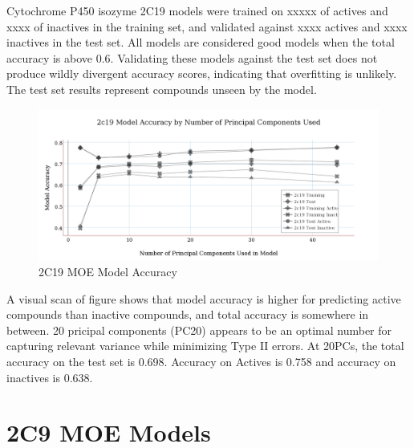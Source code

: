 Cytochrome P450 isozyme 2C19 models were trained on xxxxx of actives and xxxx of inactives in the training set, and validated against xxxx actives and xxxx inactives in the test set. All models are considered good models when the  total accuracy is above 0.6. Validating these models against the test set does not produce wildly divergent accuracy scores, indicating that overfitting is unlikely. The test set results represent compounds unseen by the model. 


\begin{figure}[!h]
\includegraphics[width=1\textwidth]{../img/2c19_moe_model_accuracy.png}
\caption{2C19 MOE Model Accuracy}
\end{figure}

A visual scan of figure shows that model accuracy is higher for predicting active compounds than inactive compounds, and total accuracy is somewhere in between. 20 pricipal components (PC20) appears to be an optimal number for capturing relevant variance while minimizing Type II errors. At 20PCs, the total accuracy on the test set is 0.698. Accuracy on Actives is 0.758 and accuracy on inactives is 0.638.


\section{2C9 MOE Models}

